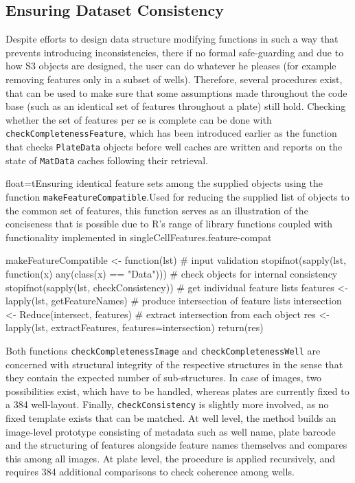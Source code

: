 \subsection{Ensuring Dataset Consistency}
Despite efforts to design data structure modifying functions in such a way that prevents introducing inconsistencies, there if no formal safe-guarding and due to how S3 objects are designed, the user can do whatever he pleases (for example removing features only in a subset of wells). Therefore, several procedures exist, that can be used to make sure that some assumptions made throughout the code base (such as an identical set of features throughout a plate) still hold. Checking whether the set of features per se is complete can be done with \texttt{checkCompletenessFeature}, which has been introduced earlier as the function that checks \texttt{PlateData} objects before well caches are written and reports on the state of \texttt{MatData} caches following their retrieval.

\begin{rlisting}{float=t}{Ensuring identical feature sets among the supplied objects using the function \texttt{makeFeatureCompatible}.}{Used for reducing the supplied list of objects to the common set of features, this function serves as an illustration of the conciseness that is possible due to R's range of library functions coupled with functionality implemented in singleCellFeatures.}{feature-compat}
\begin{rcode}
makeFeatureCompatible <- function(lst) {
  # input validation
  stopifnot(sapply(lst, function(x) any(class(x) == "Data")))
  # check objects for internal consistency
  stopifnot(sapply(lst, checkConsistency))
  # get individual feature lists
  features <- lapply(lst, getFeatureNames)
  # produce intersection of feature lists
  intersection <- Reduce(intersect, features)
  # extract intersection from each object
  res <- lapply(lst, extractFeatures, features=intersection)
  return(res)
}
\end{rcode}
\end{rlisting}

Both functions \texttt{checkCompletenessImage} and \texttt{checkCompletenessWell} are concerned with structural integrity of the respective structures in the sense that they contain the expected number of sub-structures. In case of images, two possibilities exist, which have to be handled, whereas plates are currently fixed to a 384 well-layout. Finally, \texttt{checkConsistency} is slightly more involved, as no fixed template exists that can be matched. At well level, the method builds an image-level prototype consisting of metadata such as well name, plate barcode and the structuring of features alongside feature names themselves and compares this among all images. At plate level, the procedure is applied recursively, and requires 384 additional comparisons to check coherence among wells.

